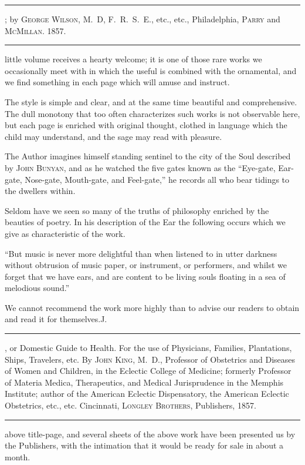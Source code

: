 
\fancybreak{* * *}
\footnotesize
{}; by \textsc{George Wilson}, M.~D, F.~R.~S.~E., etc., etc.,
Philadelphia, \textsc{Parry} and \textsc{McMillan}. 1857.
\plainbreak{1}
\normalsize

 little volume receives a hearty welcome; it is one of those rare
works we occasionally meet with in which the useful is combined
with the ornamental, and we find something in each page which will
amuse and instruct.

The style is simple and clear, and at the same time beautiful and
comprehensive. The dull monotony that too often characterizes such
works is not observable here, but each page is enriched with original
thought, clothed in language which the child may understand, and the
sage may read with pleasure.

The Author imagines himself standing sentinel to the city of the Soul
described by \textsc{John Bunyan}, and as he watched the five gates known
as the ``Eye-gate, Ear-gate, Nose-gate, Mouth-gate, and Feel-gate,'' he
records all who bear tidings to the dwellers within.

Seldom have we seen so many of the truths of philosophy enriched
by the beauties of poetry. In his description of the Ear the following
occurs which we give as characteristic of the work.

``But music is never more delightful than when listened to in utter
darkness without obtrusion of music paper, or instrument, or performers,
and whilst we forget that we have ears, and are content to be living
souls floating in a sea of melodious sound.''

We cannot recommend the work more highly than to advise our readers
to obtain and read it for themselves.\hfill{}J.\quad{}

\fancybreak{* * *}

, or Domestic Guide to Health. For the use of Physicians,
Families, Plantations, Ships, Travelers, etc. By \textsc{John King}, M.~D., Professor of
Obstetrics and Diseases of Women and Children, in the Eclectic College of Medicine;
formerly Professor of Materia Medica, Therapeutics, and Medical Jurisprudence in the
Memphis Institute; author of the American Eclectic Dispensatory, the American
Eclectic Obstetrics, etc., etc. Cincinnati, \textsc{Longley Brothers}, Publishers, 1857.
\plainbreak{1}
\normalsize

 above title-page, and several sheets of the above work have
been presented us by the Publishers, with the intimation that it would
be ready for sale in about a month.

